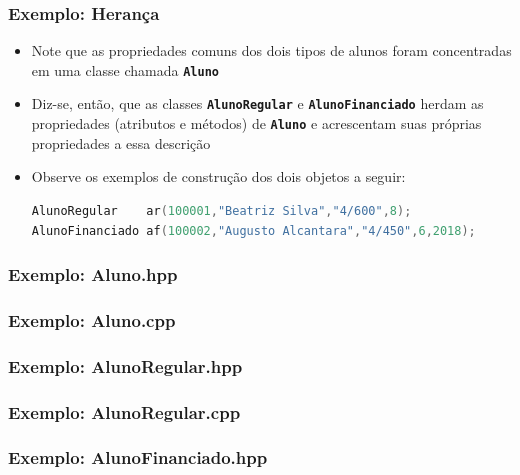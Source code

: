 \documentclass[aspectratio=169]{beamer}
\begin{document}
\begin{frame}[fragile]\frametitle{Exemplo: Herança}
\begin{itemize}
	\item Note que as propriedades comuns dos dois tipos de alunos foram concentradas em uma classe chamada \textbf{\texttt{Aluno}}
	\item Diz-se, então, que as classes \textbf{\texttt{AlunoRegular}} e \textbf{\texttt{AlunoFinanciado}} herdam as propriedades
(atributos e métodos) de \textbf{\texttt{Aluno}} e acrescentam suas próprias propriedades a essa descrição
	\item Observe os exemplos de construção dos dois objetos a seguir:
\begin{lstlisting}[language=C++,basicstyle=\ttfamily\small]
AlunoRegular    ar(100001,"Beatriz Silva","4/600",8);
AlunoFinanciado af(100002,"Augusto Alcantara","4/450",6,2018);
\end{lstlisting}
\end{itemize}
\end{frame}

\begin{frame}[fragile]\frametitle{Exemplo: Aluno.hpp}

\end{frame}

\begin{frame}[fragile]\frametitle{Exemplo: Aluno.cpp}

\end{frame}

\begin{frame}[fragile]\frametitle{Exemplo: AlunoRegular.hpp}

\end{frame}

\begin{frame}[fragile]\frametitle{Exemplo: AlunoRegular.cpp}

\end{frame}

\begin{frame}[fragile]\frametitle{Exemplo: AlunoFinanciado.hpp}

\end{frame}
\end{document}
